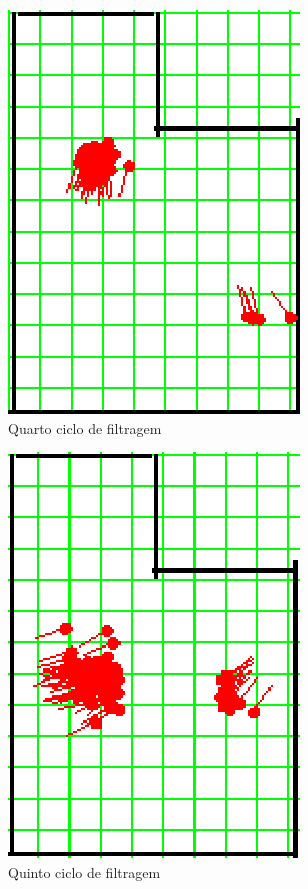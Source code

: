 \begin{figure}[H]
  \centering
  \includegraphics[scale=1]{figuras/cen2_ex2/5.eps}
  \caption[Quarto Ciclo de Filtragem]{Quarto ciclo de filtragem}
  \label{img:cen2_ex2_5}
\end{figure}

\begin{figure}[H]
  \centering
  \includegraphics[scale=1]{figuras/cen2_ex2/6.eps}
  \caption[Quinto Ciclo de Filtragem]{Quinto ciclo de filtragem}
  \label{img:cen2_ex2_6}
\end{figure}

